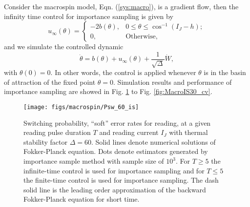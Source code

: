 \documentclass[journal,transmag]{IEEEtran}
\begin{document}
Consider the macrospin model, Eqn. (\ref{sys:macro}), is a gradient flow, then the infinity time control  for importance sampling is given by 
%
\begin{equation} \label{control:u}
  u_\infty(\theta) = \begin{cases}
     -2b(\theta), & 0 \leqslant \theta \leqslant \cos^{-1}(I_J-h); \\
    0, & \text{Otherwise},
  \end{cases}
\end{equation}
%
and we simulate the controlled dynamic
 \begin{equation}
  \dot{\theta}  = b(\theta) +u_\infty(\theta) +  \frac{1}{ \sqrt{\Delta}} \dot{W},
 \end{equation}
with $\theta(0) = 0$. In other words, the control is applied whenever $\theta$ is in the basin of attraction of the fixed point $\theta = 0.$  Simulation results and performance of importance sampling are showed in Fig. \ref{fig:MacroIS60} to Fig. \ref{fig:MacroIS30_cv}.
\begin{figure}[H]
   \centering
         \texttt{[image: figs/macrospin/Psw\_60\_is]}    
            \caption{Switching probability, ``soft'' error rates for reading,  at a given reading pulse duration $T$ and reading current $I_J$ with thermal stability factor $\Delta = 60.$ Solid lines denote numerical solutions of Fokker-Planck equation. Dots denote estimators generated by importance sample method with sample size of $10^3$. For $T \ge 5$ the infinite-time control is used for importance sampling and  for $T \le 5$ the finite-time control is used for importance sampling. The dash solid line is the leading order approximation of the backward Fokker-Planck equation for short time.}
   \label{fig:MacroIS60}
\end{figure}
%
%
\end{document}
